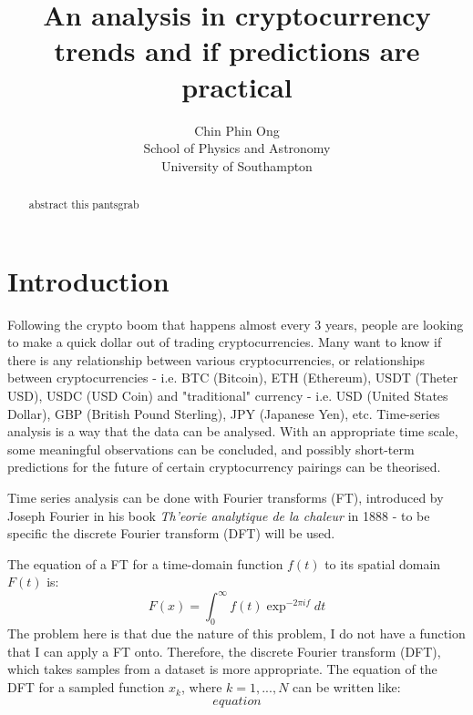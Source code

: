 \documentclass[a4paper, 10pt, conference]{ieeeconf}      %
\title{\LARGE \bf
An analysis in cryptocurrency trends and if predictions are practical
}
\author{ \parbox{3 in}{\centering Chin Phin Ong\\
          School of Physics and Astronomy\\
          University of Southampton}}
\begin{document}
\maketitle
\thispagestyle{empty}
\pagestyle{empty}

\begin{abstract}

abstract this pantsgrab

\end{abstract}

\section{Introduction}
Following the crypto boom that happens almost every 3 years, people are looking to make a quick dollar out of trading cryptocurrencies. Many want to know if there is any relationship between various cryptocurrencies, or relationships between cryptocurrencies - i.e. BTC (Bitcoin), ETH (Ethereum), USDT (Theter USD), USDC (USD Coin) and "traditional" currency - i.e. USD (United States Dollar), GBP (British Pound Sterling), JPY (Japanese Yen), etc. Time-series analysis is a way that the data can be analysed. With an appropriate time scale, some meaningful observations can be concluded, and possibly short-term predictions for the future of certain cryptocurrency pairings can be theorised.

Time series analysis can be done with Fourier transforms (FT), introduced by Joseph Fourier in his book \textit{Th'eorie analytique de la chaleur} in 1888 \cite{Fourier1888} - to be specific the discrete Fourier transform (DFT) will be used. 

The equation of a FT for a time-domain function $f(t)$ to its spatial domain $F(t)$ is:
\begin{equation}
    F(x) = \int_{0}^{\infty} f(t)\exp^{-2\pi{i}f} dt
\end{equation}
The problem here is that due the nature of this problem, I do not have a function that I can apply a FT onto. Therefore, the discrete Fourier transform (DFT), which takes samples from a dataset is more appropriate. The equation of the DFT for a sampled function $x_k$, where $k = 1,..., N$ can be written like:
\begin{equation}
    equation
\end{equation}
\end{document}

